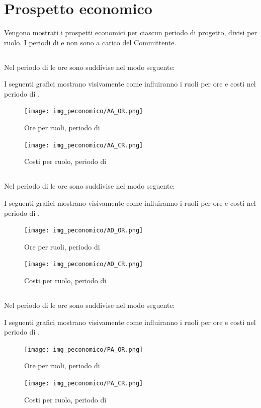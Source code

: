 \section{Prospetto economico}
Vengono mostrati i prospetti economici per ciascun periodo di progetto, divisi per ruolo. I periodi di \AR{} e \AD{} non sono a carico del Committente.

\subsection{\AR}
Nel periodo di \AR{} le ore sono suddivise nel modo seguente:

I seguenti grafici mostrano visivamente come influiranno i ruoli per ore e costi nel periodo di \AR.
\begin{figure}[H]
	\centering
	\texttt{[image: img\_peconomico/AA\_OR.png]}
	\caption{Ore per ruoli, periodo di \AR}
\end{figure}
\begin{figure}[H]
	\centering
	\texttt{[image: img\_peconomico/AA\_CR.png]}
	\caption{Costi per ruolo, periodo di \AR}
\end{figure}

\subsection{\AD}
Nel periodo di \AD{} le ore sono suddivise nel modo seguente:

I seguenti grafici mostrano visivamente come influiranno i ruoli per ore e costi nel periodo di \AD.
\begin{figure}[H]
	\centering
	\texttt{[image: img\_peconomico/AD\_OR.png]}
	\caption{Ore per ruoli, periodo di \AD}
\end{figure}
\begin{figure}[H]
	\centering
	\texttt{[image: img\_peconomico/AD\_CR.png]}
	\caption{Costi per ruolo, periodo di \AD}
\end{figure}

\subsection{\PA}
Nel periodo di \PA{} le ore sono suddivise nel modo seguente:

I seguenti grafici mostrano visivamente come influiranno i ruoli per ore e costi nel periodo di \PA.
\begin{figure}[H]
	\centering
	\texttt{[image: img\_peconomico/PA\_OR.png]}
	\caption{Ore per ruoli, periodo di \PA}
\end{figure}
\begin{figure}[H]
	\centering
	\texttt{[image: img\_peconomico/PA\_CR.png]}
	\caption{Costi per ruolo, periodo di \PA}
\end{figure}


